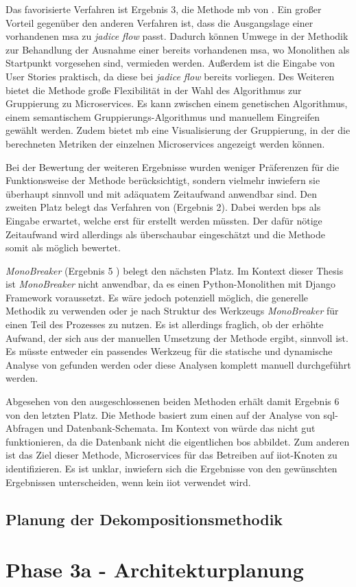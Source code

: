 Das favorisierte Verfahren ist Ergebnis 3, die Methode \gls{mb} von .
Ein großer Vorteil gegenüber den anderen Verfahren ist, dass die Ausgangslage einer vorhandenen \gls{msa} zu \emph{jadice flow} passt.
Dadurch können Umwege in der Methodik zur Behandlung der Ausnahme einer bereits vorhandenen \gls{msa}, wo Monolithen als Startpunkt vorgesehen sind, vermieden werden.
Außerdem ist die Eingabe von User Stories praktisch, da diese bei \emph{jadice flow} bereits vorliegen.
Des Weiteren bietet die Methode große Flexibilität in der Wahl des Algorithmus zur Gruppierung zu Microservices.
Es kann zwischen einem genetischen Algorithmus, einem semantischem Gruppierungs-Algorithmus und manuellem Eingreifen gewählt werden.
Zudem bietet \gls{mb} eine Visualisierung der Gruppierung, in der die berechneten Metriken der einzelnen Microservices angezeigt werden können.

Bei der Bewertung der weiteren Ergebnisse wurden weniger Präferenzen für die Funktionsweise der Methode berücksichtigt, sondern vielmehr inwiefern sie überhaupt sinnvoll und mit adäquatem Zeitaufwand anwendbar sind.
Den zweiten Platz belegt das Verfahren von  (Ergebnis 2).
Dabei werden \glspl{bp} als Eingabe erwartet, welche erst für \jf erstellt werden müssten.
Der dafür nötige Zeitaufwand wird allerdings als überschaubar eingeschätzt und die Methode somit als möglich bewertet. 

\emph{MonoBreaker} (Ergebnis 5 \cite{arh-result-no-filter-5}) belegt den nächsten Platz.
Im Kontext dieser Thesis ist \emph{MonoBreaker} nicht anwendbar, da es einen Python-Monolithen mit Django Framework voraussetzt.
Es wäre jedoch potenziell möglich, die generelle Methodik zu verwenden oder je nach Struktur des Werkzeugs \emph{MonoBreaker} für einen Teil des Prozesses zu nutzen.
Es ist allerdings fraglich, ob der erhöhte Aufwand, der sich aus der manuellen Umsetzung der Methode ergibt, sinnvoll ist.
Es müsste entweder ein passendes Werkzeug für die statische und dynamische Analyse von \jf gefunden werden oder diese Analysen komplett manuell durchgeführt werden.

Abgesehen von den ausgeschlossenen beiden Methoden erhält damit Ergebnis 6 von  den letzten Platz.
Die Methode basiert zum einen auf der Analyse von \gls{sql}-Abfragen und Datenbank-Schemata.
Im Kontext von \jf würde das nicht gut funktionieren, da die Datenbank nicht die eigentlichen \glspl{bo} abbildet.
Zum anderen ist das Ziel dieser Methode, Microservices für das Betreiben auf \gls{iiot}-Knoten zu identifizieren.
Es ist unklar, inwiefern sich die Ergebnisse von den gewünschten Ergebnissen unterscheiden, wenn kein \gls{iiot} verwendet wird.

\subsection{Planung der Dekompositionsmethodik}

\section{Phase 3a - Architekturplanung}
\label{sec:durchführung-phase3}
